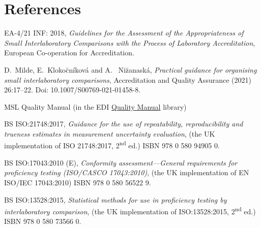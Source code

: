 \section{References}

\begingroup
\renewcommand{\section}[2]{}%

\begin{thebibliography}{99}
 EA-4/21 INF: 2018, \textit{Guidelines for the Assessment of the Appropriateness of Small Interlaboratory Comparisons with the Process of Laboratory Accreditation}, European Co-operation for Accreditation.

 D.~Milde, E.~Kloko\u{c}n\'ikov\'a and A.~ Ni\u{z}anask\'a, \textit{Practical guidance for organising small interlaboratory comparisons}, Accreditation and Quality Assurance (2021) 26:17--22. Doi: 10.1007/S00769-021-01458-8.

 MSL Quality Manual (in the EDI \href{https://edi.callaghaninnovation.govt.nz/ws/msl/QMS/QM?Web=1}{Quality Manual} library)

 BS ISO:21748:2017, \textit{Guidance for the use of repeatability, reproducibility and trueness estimates in measurement uncertainty evaluation}, (the UK implementation of ISO 21748:2017, 2\textsuperscript{nd} ed.)  ISBN 978 0 580 94905 0.

 BS ISO:17043:2010 (E), \textit{Conformity assessment---General requirements for proficiency testing (ISO/CASCO 17043:2010)}, (the UK implementation of EN ISO/IEC 17043:2010) ISBN 978 0 580 56522 9.

 BS ISO:13528:2015, \textit{Statistical methods for use in proficiency testing by interlaboratory comparison}, (the UK implementation of ISO:13528:2015, 2\textsuperscript{nd} ed.) ISBN 978 0 580 73566 0.

\end{thebibliography}
\endgroup

